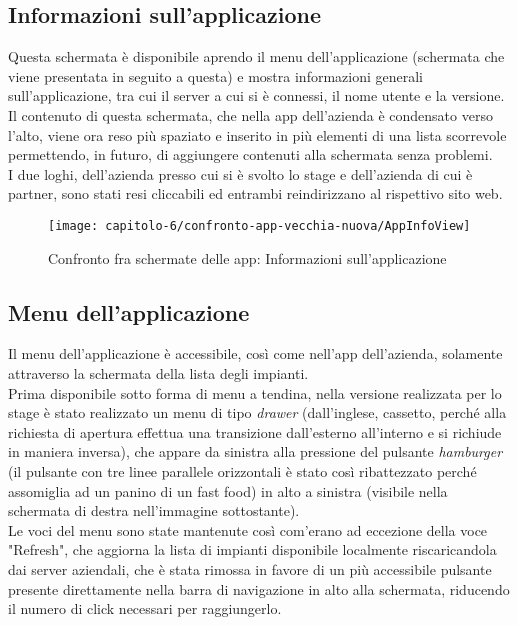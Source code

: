 
\subsection{Informazioni sull'applicazione}
\label{subsec:informazioni-applicazione}

Questa schermata è disponibile aprendo il menu dell'applicazione (schermata che viene presentata in seguito a questa) e mostra informazioni generali sull'applicazione, tra cui il server a cui si è connessi, il nome utente e la versione.\\
Il contenuto di questa schermata, che nella app dell'azienda è condensato verso l'alto, viene ora reso più spaziato e inserito in più elementi di una lista scorrevole permettendo, in futuro, di aggiungere contenuti alla schermata senza problemi.\\
I due loghi, dell'azienda presso cui si è svolto lo stage e dell'azienda di cui è partner, sono stati resi cliccabili ed entrambi reindirizzano al rispettivo sito web.

\begin{figure}[!h]
  \centering 
  \texttt{[image: capitolo-6/confronto-app-vecchia-nuova/AppInfoView]} 
  \caption{Confronto fra schermate delle app: Informazioni sull'applicazione}
\end{figure}

\clearpage %

\subsection{Menu dell'applicazione}
\label{subsec:menu-applicazione}

Il menu dell'applicazione è accessibile, così come nell'app dell'azienda, solamente attraverso la schermata della lista degli impianti.\\
Prima disponibile sotto forma di menu a tendina, nella versione realizzata per lo stage è stato realizzato un menu di tipo \emph{drawer} (dall'inglese, cassetto, perché alla richiesta di apertura effettua una transizione dall'esterno all'interno e si richiude in maniera inversa), che appare da sinistra alla pressione del pulsante \emph{hamburger} (il pulsante con tre linee parallele orizzontali è stato così ribattezzato perché assomiglia ad un panino di un fast food) in alto a sinistra (visibile nella schermata di destra nell'immagine sottostante).\\
Le voci del menu sono state mantenute così com'erano ad eccezione della voce "Refresh", che aggiorna la lista di impianti disponibile localmente riscaricandola dai server aziendali, che è stata rimossa in favore di un più accessibile pulsante presente direttamente nella barra di navigazione in alto alla schermata, riducendo il numero di click necessari per raggiungerlo.

